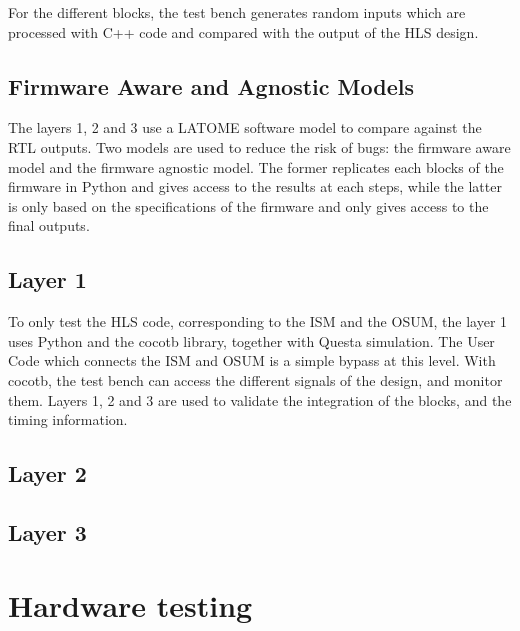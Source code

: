 For the different blocks, the test bench generates random inputs which are processed with C++ code and compared with the output of the HLS design.

\subsection{Firmware Aware and Agnostic Models}

The layers 1, 2 and 3 use a LATOME software model to compare against the RTL outputs. Two models are used to reduce the risk of bugs: the firmware aware model and the firmware agnostic model. The former replicates each blocks of the firmware in Python and gives access to the results at each steps, while the latter is only based on the specifications of the firmware and only gives access to the final outputs.

\subsection{Layer 1}

To only test the HLS code, corresponding to the ISM and the OSUM, the layer 1 uses Python and the cocotb library, together with Questa simulation. The User Code which connects the ISM and OSUM is a simple bypass at this level. With cocotb, the test bench can access the different signals of the design, and monitor them. Layers 1, 2 and 3 are used to validate the integration of the blocks, and the timing information.

\subsection{Layer 2}



\subsection{Layer 3}


\section{Hardware testing}
